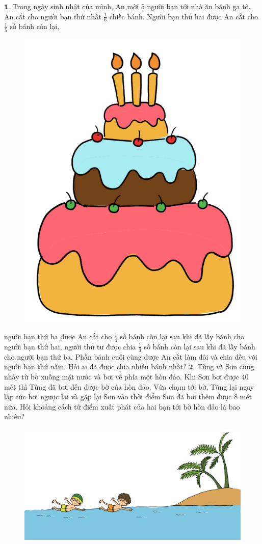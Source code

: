 \begin{multicols}{2}
	$\pmb{1.}$ 	Trong ngày sinh nhật của mình, An mời $5$ người bạn tới nhà ăn bánh ga tô. An cắt cho người bạn thứ nhất $\frac{1}{6}$ chiếc bánh. Người bạn thứ hai được An cắt cho $\frac{1}{5}$ số bánh còn lại,
	\begin{figure}[H]
		\centering
		\vspace*{-10pt}
		\captionsetup{labelformat= empty, justification=centering}
		\includegraphics[width=0.6\linewidth]{Pi10_bai1}
		\vspace*{-5pt}
	\end{figure}
	người bạn thứ ba được An cắt cho $\frac{1}{4}$ số bánh còn lại sau khi đã lấy bánh cho người bạn thứ hai, người thứ tư được chia $\frac{1}{3}$ số bánh còn lại sau khi đã lấy bánh cho người bạn thứ ba. Phần bánh cuối cùng được An cắt làm đôi và chia đều với người bạn thứ năm. Hỏi ai đã được chia nhiều bánh nhất?
	\vskip 0.1cm
	$\pmb{2.}$ Tùng và Sơn cùng nhảy từ bờ xuống mặt nước và bơi về phía một hòn đảo.  Khi Sơn bơi được $40$ mét thì Tùng đã bơi đến được bờ của hòn đảo. Vừa chạm tới bờ, Tùng lại ngay lập tức bơi ngược lại và gặp lại Sơn vào thời điểm Sơn đã bơi thêm được $8$ mét nữa. Hỏi khoảng cách từ điểm xuất phát của hai bạn tới bờ hòn đảo là bao nhiêu?
	\begin{figure}[H]
		\centering
		\vspace*{5pt}
		\captionsetup{labelformat= empty, justification=centering}
		\includegraphics[width=1\linewidth]{Pi10_bai2}

\end{figure}
\end{multicols}
